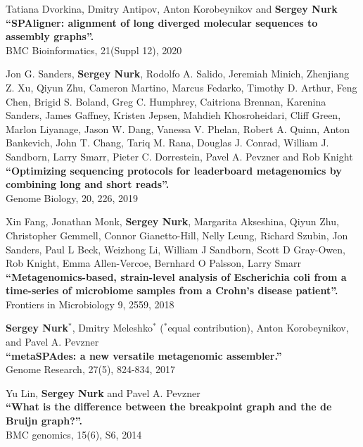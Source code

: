 \begin{outerlist}
\item
Tatiana Dvorkina, Dmitry Antipov, Anton Korobeynikov and \textbf{Sergey Nurk}\\
\textbf{``SPAligner: alignment of long diverged molecular sequences to assembly graphs''.}\\
BMC Bioinformatics, 21(Suppl 12), 2020

\item
Jon G. Sanders, \textbf{Sergey Nurk}, Rodolfo A. Salido, Jeremiah Minich, Zhenjiang Z. Xu, Qiyun Zhu, Cameron Martino, Marcus Fedarko, Timothy D. Arthur, Feng Chen, Brigid S. Boland, Greg C. Humphrey, Caitriona Brennan, Karenina Sanders, James Gaffney, Kristen Jepsen, Mahdieh Khosroheidari, Cliff Green, Marlon Liyanage, Jason W. Dang, Vanessa V. Phelan, Robert A. Quinn, Anton Bankevich, John T. Chang, Tariq M. Rana, Douglas J. Conrad, William J. Sandborn, Larry Smarr, Pieter C. Dorrestein, Pavel A. Pevzner and Rob Knight\\
\textbf{``Optimizing sequencing protocols for leaderboard metagenomics by combining long and short reads''.}\\
Genome Biology, 20, 226, 2019

\item
Xin Fang, Jonathan Monk, \textbf{Sergey Nurk}, Margarita Akseshina, Qiyun Zhu, Christopher Gemmell, Connor Gianetto-Hill, Nelly Leung, Richard Szubin, Jon Sanders, Paul L Beck, Weizhong Li, William J Sandborn, Scott D Gray-Owen, Rob Knight, Emma Allen-Vercoe, Bernhard O Palsson, Larry Smarr\\
\textbf{``Metagenomics-based, strain-level analysis of Escherichia coli from a time-series of microbiome samples from a Crohn’s disease patient''.}\\
Frontiers in Microbiology 9, 2559, 2018

\item
\textbf{Sergey Nurk}$^*$, Dmitry Meleshko$^*$ ($^*$equal contribution), Anton Korobeynikov, and Pavel A. Pevzner \\
\textbf{``metaSPAdes: a new versatile metagenomic assembler.''} \\
Genome Research, 27(5), 824-834, 2017

\item
Yu Lin, \textbf{Sergey Nurk} and Pavel A. Pevzner\\
\textbf{``What is the difference between the breakpoint graph and the de Bruijn graph?''.} \\
BMC genomics, 15(6), S6, 2014


\end{outerlist}
